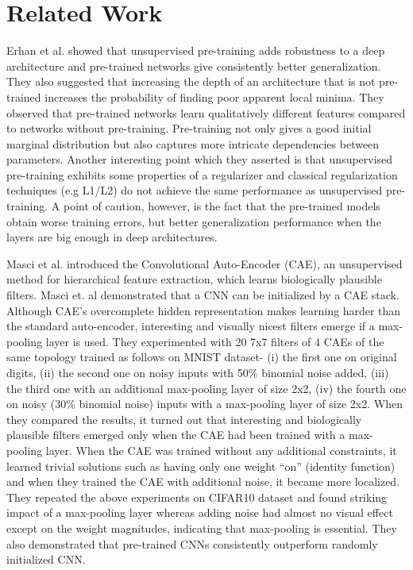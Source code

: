 \documentclass{article}
\begin{document}
\section{Related Work}
Erhan et al. \citep{Erhan10} showed that unsupervised pre-training adds robustness to a deep architecture and pre-trained networks give consistently better
generalization. They also suggested that increasing the depth of an architecture that is not pre-trained increases the probability of finding poor apparent local minima. They observed that pre-trained networks learn qualitatively different features compared to networks without pre-training. Pre-training not only gives a good initial
marginal distribution but also captures more intricate dependencies between parameters. Another interesting point which they asserted is that unsupervised pre-training exhibits some properties of a regularizer and classical regularization techniques (e.g L1/L2) do not achieve
the same performance as unsupervised pre-training. A point of caution, however, is the fact that the pre-trained models obtain worse training errors, but better generalization performance when the layers are big enough in deep architectures.

Masci et al. \citep{masci11} introduced the Convolutional Auto-Encoder (CAE), an unsupervised method for hierarchical feature extraction, which learns biologically plausible filters. Masci et. al demonstrated that a CNN can be initialized by a CAE stack. Although CAE’s overcomplete hidden representation makes learning harder than the standard auto-encoder,  interesting and visually nicest filters emerge if a max-pooling layer is used. They experimented with 20 7x7 filters of 4 CAEs of the same topology trained as follows on MNIST dataset- (i) the first one on original digits, (ii) the second one on noisy inputs with 50\% binomial noise added,
(iii) the third one with an additional max-pooling layer of size 2x2,
(iv) the fourth one on noisy (30\% binomial noise) inputs with a max-pooling layer of size 2x2.
When they compared the results, it turned out that interesting and biologically plausible filters emerged only when the CAE had been trained with a max-pooling layer. When the CAE was trained without any additional constraints, it learned trivial solutions such as having only one weight “on” (identity function) and when they trained the CAE with additional noise, it became more localized. They repeated the above experiments on CIFAR10 dataset and found striking impact of a max-pooling layer whereas adding noise had almost no visual effect except on the weight magnitudes, indicating that max-pooling is essential. They also demonstrated that pre-trained CNNs consistently outperform randomly initialized CNN.
\end{document}
